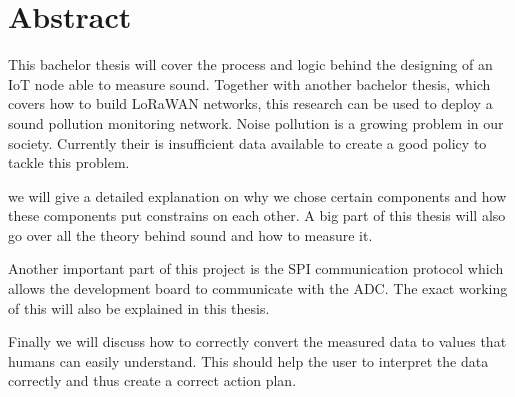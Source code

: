 \chapter*{Abstract}



This bachelor thesis will cover the process and logic behind the designing of an IoT node able to measure sound. Together with another bachelor thesis, which covers how to build LoRaWAN networks, this research can be used to deploy a sound pollution monitoring network.
Noise pollution is a growing problem in our society. Currently their is insufficient data available to create a good policy to tackle this problem. 

we will give a detailed explanation on why we chose certain components and how these components put constrains on each other. A big part of this thesis will also go over all the theory behind sound and how to measure it. 

Another important part  of this project is the SPI communication protocol which allows the development board to communicate with the ADC. The exact working of this will also be explained in this thesis.

Finally we will discuss how to correctly convert the measured data to values that humans can easily understand. This should help the user to interpret the data correctly and thus create a correct action plan.





